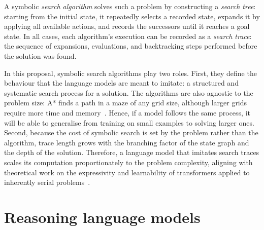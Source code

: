 A symbolic \emph{search algorithm} solves such a problem by constructing a \emph{search tree}: starting from the initial state, it repeatedly selects a recorded state, expands it by applying all available actions, and records the successors until it reaches a goal state.
In all cases, each algorithm's execution can be recorded as a \emph{search trace}: the sequence of expansions, evaluations, and backtracking steps performed before the solution was found.

In this proposal, symbolic search algorithms play two roles.
First, they define the behaviour that the language models are meant to imitate: a structured and systematic search process for a solution.
The algorithms are also agnostic to the problem size: A* finds a path in a maze of any grid size, although larger grids require more time and memory~\citep{russel2010}.
Hence, if a model follows the same process, it will be able to generalise from training on small examples to solving larger ones.
Second, because the cost of symbolic search is set by the problem rather than the algorithm, trace length grows with the branching factor of the state graph and the depth of the solution.
Therefore, a language model that imitates search traces scales its computation proportionately to the problem complexity, aligning with theoretical work on the expressivity and learnability of transformers applied to inherently serial problems~\citep{merrillExpressivePowerTransformers2024,sanfordUnderstandingTransformerReasoning2024,abbeHowFarCan2024}.


\section{Reasoning language models}
\label{sec:bg_reasoning}

